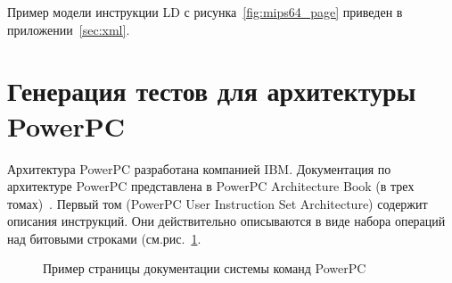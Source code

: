 Пример модели инструкции LD с рисунка~\ref{fig:mips64_page} приведен в приложении~\ref{sec:xml}.

\section{Генерация тестов для архитектуры PowerPC}

Архитектура PowerPC разработана компанией IBM. Документация по архитектуре
PowerPC представлена в PowerPC Architecture Book (в трех томах)~\cite{PowerPC}. Первый том (PowerPC User Instruction Set Architecture) содержит описания инструкций. Они действительно описываются в виде набора операций над битовыми строками (см.рис.~\ref{fig:ppc_page}.

\begin{figure}
\caption{Пример страницы документации системы команд PowerPC}\label{fig:ppc_page}
\end{figure}

